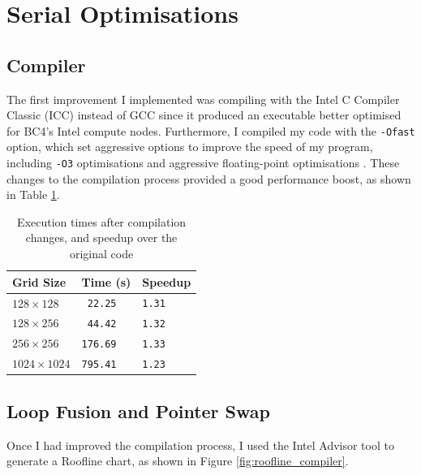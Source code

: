 \documentclass[twocolumn, a4paper]{article}
\begin{document}
\section{Serial Optimisations}


\subsection{Compiler}

The first improvement I implemented was compiling with the Intel C Compiler Classic (ICC) instead of GCC since it produced an executable better optimised for BC4's Intel compute nodes.
Furthermore, I compiled my code with the \texttt{-Ofast} option, which set aggressive options to improve the speed of my program, including \texttt{-O3} optimisations and aggressive floating-point optimisations \cite{icc}.
These changes to the compilation process provided a good performance boost, as shown in Table \ref{tab:compiler_changes}.

\begin{table}[htbp]
  \begin{center}
  \caption{Execution times after compilation changes, and speedup over the original code}\label{tab:compiler_changes}
  \begin{tabular}{l | l l} 
      \hline\hline
      Grid Size&Time (s)&Speedup\\
      \hline
      $128 \times 128$&\texttt{ 22.25}&\texttt{1.31}\\
      $128 \times 256$&\texttt{ 44.42}&\texttt{1.32}\\
      $256 \times 256$&\texttt{176.69}&\texttt{1.33}\\
      $1024 \times 1024$&\texttt{795.41}&\texttt{1.23}\\
      \hline
    \end{tabular}
  \end{center}
\end{table}

\subsection{Loop Fusion and Pointer Swap}

Once I had improved the compilation process, I used the Intel Advisor tool to generate a Roofline chart, as shown in Figure \ref{fig:roofline_compiler}.
\end{document}

